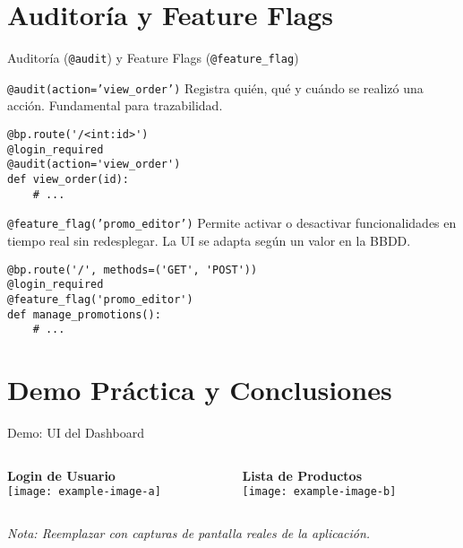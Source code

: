 \documentclass[spanish]{beamer}
\begin{document}
\section{Auditoría y Feature Flags}

\begin{frame}[fragile]{Auditoría (\texttt{@audit}) y Feature Flags (\texttt{@feature\_flag})}
    \begin{block}{\texttt{@audit(action='view\_order')}}
        Registra quién, qué y cuándo se realizó una acción. Fundamental para trazabilidad.
    \end{block}
    \begin{lstlisting}
@bp.route('/<int:id>')
@login_required
@audit(action='view_order')
def view_order(id):
    # ...
    \end{lstlisting}

    \begin{block}{\texttt{@feature\_flag('promo\_editor')}}
        Permite activar o desactivar funcionalidades en tiempo real sin redesplegar. La UI se adapta según un valor en la BBDD.
    \end{block}
    \begin{lstlisting}
@bp.route('/', methods=('GET', 'POST'))
@login_required
@feature_flag('promo_editor')
def manage_promotions():
    # ...
    \end{lstlisting}
\end{frame}


\section{Demo Práctica y Conclusiones}

\begin{frame}{Demo: UI del Dashboard}
    \begin{columns}
        \begin{column}{0.5\textwidth}
            \textbf{Login de Usuario}\\
            \texttt{[image: example-image-a]}
        \end{column}
        \begin{column}{0.5\textwidth}
            \textbf{Lista de Productos}\\
            \texttt{[image: example-image-b]}
        \end{column}
    \end{columns}
    \tiny{\textit{Nota: Reemplazar con capturas de pantalla reales de la aplicación.}}
\end{frame}
\end{document}
